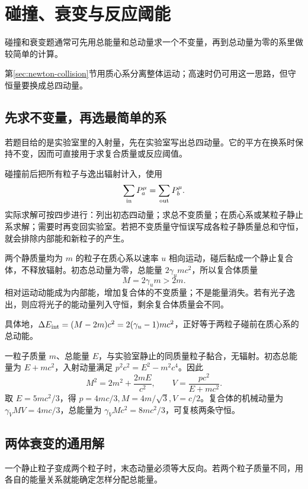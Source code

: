 \section{碰撞、衰变与反应阈能}\label{sec:sr-collision}
碰撞和衰变题通常可先用总能量和总动量求一个不变量，再到总动量为零的系里做较简单的计算。

第\ref{sec:newton-collision}节用质心系分离整体运动；高速时仍可用这一思路，但守恒量要换成总四动量。
\subsection{先求不变量，再选最简单的系}
若题目给的是实验室里的入射量，先在实验室写出总四动量。它的平方在换系时保持不变，因而可直接用于求复合质量或反应阈值。

碰撞前后把所有粒子与逸出辐射计入，使用
\[
\sum_{\rm in}P_a^\mu=\sum_{\rm out}P_b^\mu.
\]
实际求解可按四步进行：列出初态四动量；求总不变质量；在质心系或某粒子静止系求解；需要时再变回实验室。若把不变质量守恒误写成各粒子静质量总和守恒，就会排除内部能和新粒子的产生。

\begin{example}
两个静质量均为 $m$ 的粒子在质心系以速率 $u$ 相向运动，碰后黏成一个静止复合体，不释放辐射。初态总动量为零，总能量 $2\gamma_umc^2$，所以复合体质量
\[
M=2\gamma_um>2m.
\]
相对运动动能成为内部能，增加复合体的不变质量；不是能量消失。若有光子逸出，则应将光子的能动量列入守恒，剩余复合体质量会不同。

具体地，$\Delta E_{\rm int}=(M-2m)c^2=2(\gamma_u-1)mc^2$，正好等于两粒子碰前在质心系的总动能。
\end{example}

\begin{example}[固定靶黏合与复合体速度]
一粒子质量 $m$、总能量 $E$，与实验室静止的同质量粒子黏合，无辐射。初态总能量为 $E+mc^2$，入射动量满足 $p^2c^2=E^2-m^2c^4$。因此
\[
M^2=2m^2+\frac{2mE}{c^2},\qquad V=\frac{pc^2}{E+mc^2}.
\]
取 $E=5mc^2/3$，得 $p=4mc/3,M=4m/\sqrt3,V=c/2$。复合体的机械动量为 $\gamma_VM V=4mc/3$，总能量为 $\gamma_VM c^2=8mc^2/3$，可复核两条守恒。
\end{example}

\subsection{两体衰变的通用解}
一个静止粒子变成两个粒子时，末态动量必须等大反向。若两个粒子质量不同，用各自的能量关系就能确定怎样分配总能量。

